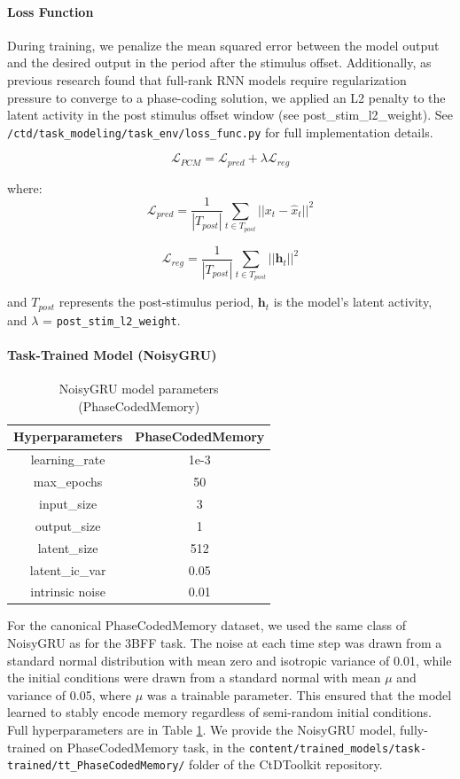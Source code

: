 \documentclass{article}
\begin{document}
\paragraph{Loss Function}
During training, we penalize the mean squared error between the model output and the desired output in the period after the stimulus offset. Additionally, as previous research found that full-rank RNN models require regularization pressure to converge to a phase-coding solution, we applied an L2 penalty to the latent activity in the post stimulus offset window (see post\_stim\_l2\_weight). See \texttt{/ctd/task\_modeling/task\_env/loss\_func.py} for full implementation details.

$$\mathcal{L}_{PCM} = \mathcal{L}_{pred} + \lambda \mathcal{L}_{reg}$$

where:
$$\mathcal{L}_{pred} = \frac{1}{|T_{post}|} \sum_{t \in T_{post}} ||x_t - \hat{x}_t||^2$$

$$\mathcal{L}_{reg} = \frac{1}{|T_{post}|} \sum_{t \in T_{post}} ||\mathbf{h}_t||^2$$

and $T_{post}$ represents the post-stimulus period, $\mathbf{h}_t$ is the model's latent activity, and $\lambda$ = \texttt{post\_stim\_l2\_weight}.

\paragraph{Task-Trained Model (NoisyGRU)}
\begin{table}[ht]
\centering
\begin{tabular}{|c|c|}
\hline
\textbf{Hyperparameters} & \textbf{PhaseCodedMemory} \\ \hline
learning\_rate &  1e-3  \\ \hline
max\_epochs &  50  \\ \hline
input\_size & 3 \\ \hline
output\_size & 1 \\ \hline
latent\_size & 512 \\ \hline
latent\_ic\_var & 0.05  \\ \hline
intrinsic noise &  0.01 \\ \hline
\end{tabular}
\caption{NoisyGRU model parameters (PhaseCodedMemory)}
\label{table:PCMGRU}
\end{table}

For the canonical PhaseCodedMemory dataset, we used the same class of NoisyGRU as for the 3BFF task. The noise at each time step was drawn from a standard normal distribution with mean zero and isotropic variance of 0.01, while the initial conditions were drawn from a standard normal with mean $\mu$ and variance of 0.05, where $\mu$ was a trainable parameter. This ensured that the model learned to stably encode memory regardless of semi-random initial conditions. Full hyperparameters are in Table \ref{table:PCMGRU}. We provide the NoisyGRU model, fully-trained on PhaseCodedMemory task, in the \texttt{content/trained\_models/task-trained/tt\_PhaseCodedMemory/} folder of the CtDToolkit repository.
\end{document}
